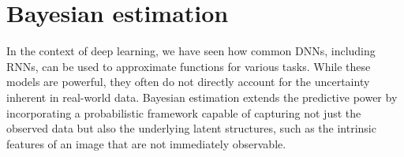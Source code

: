 \section{Bayesian estimation}
\label{sec:bayesian_estimation}





In the context of deep learning, we have seen how common DNNs, including RNNs, can be
used to approximate functions for various tasks. While these models are powerful,
they often do not directly account for the uncertainty inherent in real-world
data. Bayesian estimation extends the predictive power  by
incorporating a probabilistic framework capable of capturing not just the
observed data but also the underlying latent structures, such as the intrinsic
features of an image that are not immediately observable.




